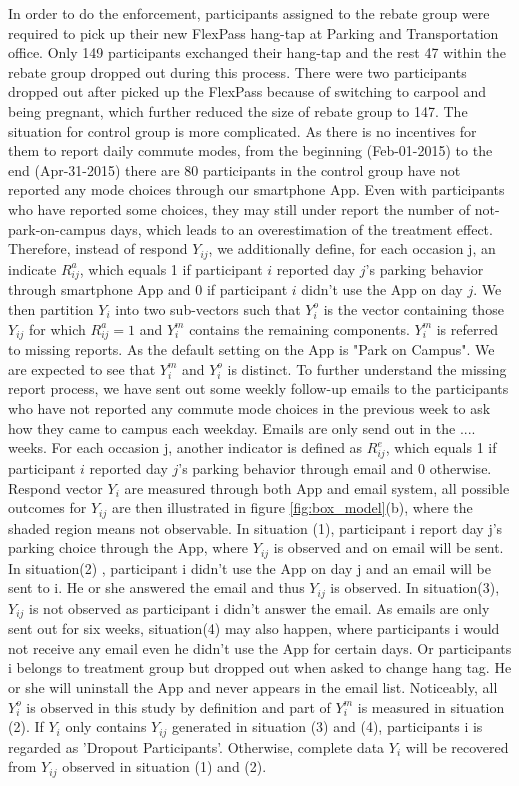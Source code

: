\documentclass[preprint,12pt]{elsarticle}
\begin{document}
In order to do the enforcement, participants assigned to the rebate group were required to pick up their new FlexPass hang-tap at Parking and Transportation office. Only 149 participants exchanged their hang-tap and the rest 47 within the rebate group dropped out during this process. There were two participants dropped out after picked up the FlexPass because of switching to carpool and being pregnant, which further reduced the size of rebate group to 147. The situation for control group is more complicated. As there is no incentives for them to report daily commute modes, from the beginning (Feb-01-2015) to the end (Apr-31-2015) there are 80 participants in the control group have not reported any mode choices through our smartphone App. Even with participants who have reported some choices, they may still under report the number of not-park-on-campus days, which leads to an overestimation of the treatment effect. Therefore, instead of respond $Y_{ij}$, we additionally define, for each occasion j, an indicate $R_{ij}^a$, which equals 1 if participant $i$ reported day $j$'s parking behavior through smartphone App and 0 if participant $i$ didn't use the App on day $j$. We then partition $Y_i$ into two sub-vectors such that $Y^o_i$ is the vector containing those $Y_{ij}$ for which $R_{ij}^a=1$ and $Y^m_i$ contains the remaining components. $Y^m_i$ is referred to missing reports. As the default setting on the App is "Park on Campus". We are expected to see that $Y^m_i$ and $Y^o_i$ is distinct. To further understand the missing report process, we have sent out some weekly follow-up emails to the participants who have not reported any commute mode choices in the previous week to ask how they came to campus each weekday. Emails are only send out in the .... weeks. For each occasion j, another indicator is defined as $R_{ij}^e$, which equals 1 if participant $i$ reported day $j$'s parking behavior through email and 0 otherwise.
\\
 
Respond vector $Y_i$ are measured through both App and email system, all possible outcomes for $Y_{ij}$ are then illustrated in figure \ref{fig:box_model}(b), where the shaded region means not observable. In situation (1), participant i report day j's parking choice through the App, where $Y_{ij}$ is observed and on email will be sent. In situation(2) , participant i didn't use the App on day j and an email will be sent to i. He or she answered the email and thus $Y_{ij}$ is observed. In situation(3), $Y_{ij}$ is not observed as participant i didn't answer the email. As emails are only sent out for six weeks, situation(4) may also happen, where participants i would not receive any email even he didn't use the App for certain days. Or participants i belongs to treatment group but dropped out when asked to change hang tag. He or she will uninstall the App and never appears in the email list. Noticeably, all $Y^o_i$ is observed in this study by definition and part of $Y^m_i$ is measured in situation (2). If $Y_i$ only contains $Y_{ij}$ generated in situation (3) and (4), participants i is regarded as 'Dropout Participants'. Otherwise, complete data $Y_i$ will be recovered from $Y_{ij}$ observed in situation (1) and (2).
\end{document}
